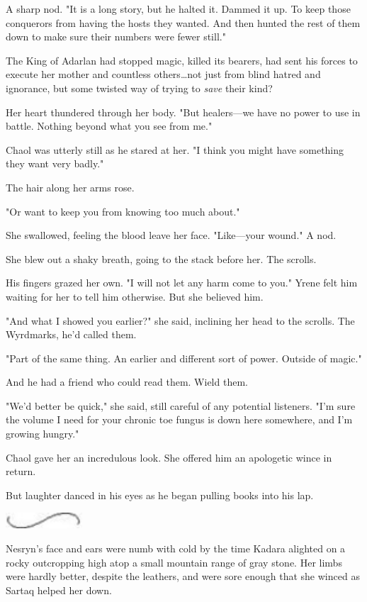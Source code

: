 A sharp nod.
"It is a long story, but he halted it.
Dammed it up.
To keep those conquerors from having the hosts they wanted.
And then hunted the rest of them down to make sure their numbers were fewer still."

The King of Adarlan had stopped magic, killed its bearers, had sent his forces to execute her mother and countless others\ldots not just from blind hatred and ignorance, but some twisted way of trying to \emph{save} their kind?

Her heart thundered through her body.
"But healers---we have no power to use in battle.
Nothing beyond what you see from me."

Chaol was utterly still as he stared at her.
"I think you might have something they want very badly."

The hair along her arms rose.

"Or want to keep you from knowing too much about."

She swallowed, feeling the blood leave her face.
"Like---your wound."
A nod.

She blew out a shaky breath, going to the stack before her.
The scrolls.

His fingers grazed her own.
"I will not let any harm come to you."
Yrene felt him waiting for her to tell him otherwise.
But she believed him.

"And what I showed you earlier?"
she said, inclining her head to the scrolls.
The Wyrdmarks, he'd called them.

"Part of the same thing.
An earlier and different sort of power.
Outside of magic."

And he had a friend who could read them.
Wield them.

"We'd better be quick," she said, still careful of any potential listeners.
"I'm sure the volume I need for your chronic toe fungus is down here somewhere, and I'm growing hungry."

Chaol gave her an incredulous look.
She offered him an apologetic wince in return.

But laughter danced in his eyes as he began pulling books into his lap.

\begin{center}
	\includegraphics[width=1.12in,height=0.24in]{images/seperator}
\end{center}

Nesryn's face and ears were numb with cold by the time Kadara alighted on a rocky outcropping high atop a small mountain range of gray stone.
Her limbs were hardly better, despite the leathers, and were sore enough that she winced as Sartaq helped her down.

